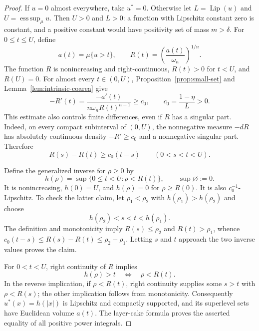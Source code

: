 \documentclass[11pt]{article}
\numberwithin{equation}{section}
\theoremstyle{definition}
\theoremstyle{remark}
\begin{document}
\begin{proof}
If $u=0$ almost everywhere, take $u^*=0$.  Otherwise let
$L=\operatorname{Lip}(u)$ and $U=\operatorname*{ess\,sup}_\mu u$.  Then $U>0$ and $L>0$: a function
with Lipschitz constant zero is constant, and a positive constant
would have positivity set of mass $m>\delta$.
For $0\le t\le U$, define
\[
 a(t)=\mu\{u>t\},\qquad
 R(t)=\left(\frac{a(t)}{\omega_n}\right)^{1/n}.
\]
The function $R$ is nonincreasing and right-continuous,
$R(t)>0$ for $t<U$, and $R(U)=0$.
For almost every $t\in(0,U)$, Proposition~\ref{prop:small-set} and
Lemma~\ref{lem:intrinsic-coarea} give
\begin{equation}
 -R'(t)=\frac{-a'(t)}{n\omega_n R(t)^{n-1}}
      \ge c_0,\qquad c_0=\frac{1-\eta}{L}>0.
 \label{eq:radius-distribution-slope}
\end{equation}
This estimate also controls finite differences, even if $R$ has a
singular part.  Indeed, on every compact subinterval of $(0,U)$,
the nonnegative measure $-dR$ has absolutely continuous density
$-R'\ge c_0$ and a nonnegative singular part.  Therefore
\begin{equation}
 R(s)-R(t)\ge c_0(t-s)
 \qquad(0<s<t<U).
 \label{eq:radius-distribution-difference}
\end{equation}

Define the generalized inverse for $\rho\ge0$ by
\begin{equation}
 h(\rho)=\sup\{0\le t<U:\rho<R(t)\},
 \qquad \sup\varnothing:=0.
 \label{eq:generalized-inverse}
\end{equation}
It is nonincreasing, $h(0)=U$, and $h(\rho)=0$ for
$\rho\ge R(0)$.  It is also $c_0^{-1}$-Lipschitz.  To check the latter
claim, let $\rho_1<\rho_2$ with $h(\rho_1)>h(\rho_2)$ and choose
\[
 h(\rho_2)<s<t<h(\rho_1).
\]
The definition and monotonicity imply
$R(s)\le\rho_2$ and $R(t)>\rho_1$, whence
$c_0(t-s)\le R(s)-R(t)\le\rho_2-\rho_1$.
Letting $s$ and $t$ approach the two inverse values proves the claim.

For $0<t<U$, right continuity of $R$ implies
\begin{equation}
 h(\rho)>t\quad\Longleftrightarrow\quad \rho<R(t).
 \label{eq:inverse-superlevels}
\end{equation}
In the reverse implication, if $\rho<R(t)$, right continuity supplies
some $s>t$ with $\rho<R(s)$; the other implication follows from
monotonicity.  Consequently $u^*(x)=h(|x|)$ is Lipschitz and compactly
supported, and its superlevel sets have Euclidean volume $a(t)$.
The layer-cake formula proves the asserted equality of all positive
power integrals.


\end{proof}
\end{document}
